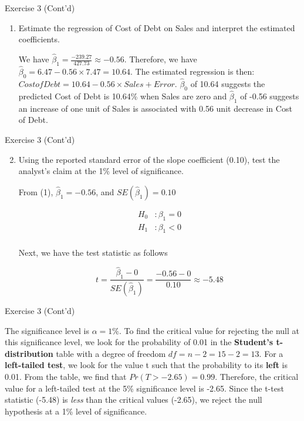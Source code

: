 \documentclass[
  ignorenonframetext,
  aspectratio=43,
]{beamer}
\let\olditem\item
\renewcommand\item{\olditem\justifying}
\begin{document}
\begin{frame}{Exercise 3 (Cont'd)}
\protect\hypertarget{exercise-3-contd}{}
\begin{enumerate}
\item
  Estimate the regression of Cost of Debt on Sales and interpret the
  estimated coefficients.

  \pause

  We have \(\hat{\beta}_1 = \frac{-239.27}{427.73} \approx -0.56\).
  Therefore, we have \(\hat{\beta}_0 = 6.47-0.56 \times 7.47=10.64\).
  The estimated regression is then:
  \(Cost of Debt= 10.64-0.56 \times Sales+Error\). \(\hat{\beta}_0\) of
  10.64 suggests the predicted Cost of Debt is 10.64\% when Sales are
  zero and \(\hat{\beta}_1\) of -0.56 suggests an increase of one unit
  of Sales is associated with 0.56 unit decrease in Cost of Debt.
\end{enumerate}
\end{frame}

\begin{frame}{Exercise 3 (Cont'd)}
\protect\hypertarget{exercise-3-contd-1}{}
\begin{enumerate}
\setcounter{enumi}{1}
\item
  Using the reported standard error of the slope coefficient (0.10),
  test the analyst's claim at the 1\% level of significance.

  \pause

  From (1), \(\hat{\beta}_1 = -0.56\), and \(SE(\hat{\beta}_1) = 0.10\)

  \pause

  \[
   \begin{aligned}
   H_0 &: \beta_1 = 0 \\
   H_1 &: \beta_1 < 0 \\
   \end{aligned}
   \]

  \pause

  Next, we have the test statistic as follows

  \pause

  \[
   t = \frac{\hat{\beta}_1 - 0}{SE(\hat{\beta}_1)} = \frac{-0.56 - 0}{0.10} \approx -5.48
   \]
\end{enumerate}
\end{frame}

\begin{frame}{Exercise 3 (Cont'd)}
\protect\hypertarget{exercise-3-contd-2}{}
\pause

The significance level is \(\alpha=1\%\). To find the critical value for
rejecting the null at this significance level, we look for the
probability of 0.01 in the \textbf{Student's t-distribution} table with
a degree of freedom \(df=n-2=15-2=13\). For a \textbf{left-tailed test},
we look for the value t such that the probability to its \textbf{left}
is 0.01. From the table, we find that \(Pr(T>-2.65)= 0.99\). Therefore,
the critical value for a left-tailed test at the 5\% significance level
is -2.65. Since the t-test statistic (-5.48) is \emph{less} than the
critical values (-2.65), we reject the null hypothesis at a 1\% level of
significance.
\end{frame}
\end{document}
